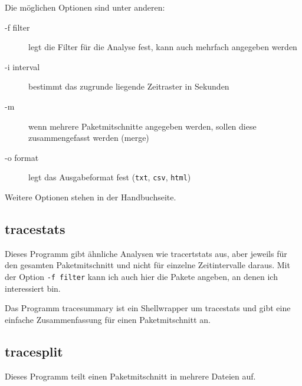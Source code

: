 \begin{normaltext}
  Die möglichen Optionen sind unter anderen:
  \begin{description}
    \item[-f filter] legt die Filter für die Analyse fest, kann auch mehrfach
      angegeben werden
    \item[-i interval] bestimmt das zugrunde liegende Zeitraster in Sekunden
    \item[-m] wenn mehrere Paketmitschnitte angegeben werden, sollen diese
      zusammengefasst werden (merge)
    \item[-o format] legt das Ausgabeformat fest (\verb?txt?, \verb?csv?,
      \verb?html?)
  \end{description}
  Weitere Optionen stehen in der Handbuchseite.
  
  \subsection*{tracestats}
  Dieses Programm gibt ähnliche Analysen wie tracertstats aus, aber jeweils
  für den gesamten Paketmitschnitt und nicht für einzelne Zeitintervalle
  daraus. Mit der Option \verb?-f filter? kann ich auch hier die Pakete
  angeben, an denen ich interessiert bin.

  Das Programm tracesummary ist ein Shellwrapper um tracestats und gibt eine
  einfache Zusammenfassung für einen Paketmitschnitt an.

  \subsection*{tracesplit}
  Dieses Programm teilt einen Paketmitschnitt in mehrere Dateien auf.


\end{normaltext}
